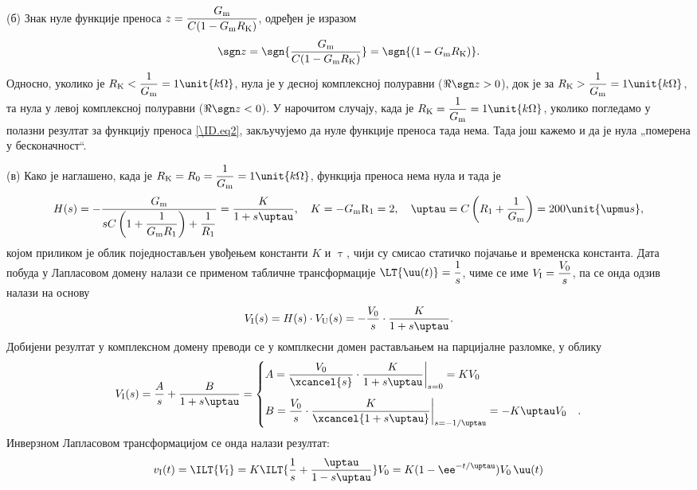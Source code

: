 (б) Знак нуле функције преноса $z = \dfrac{G_{\rm m}}{C(1 - G_{\rm m} R_{\rm K})}$, одређен је изразом
\begin{equation}
    \sgn z = \sgn {\dfrac{G_{\rm m}}{C(1 - G_{\rm m} R_{\rm K})}} = \sgn{(1 - G_{\rm m} R_{\rm K})}.
\end{equation}
Односно, уколико је $R_{\rm K} < \dfrac{1}{G_{\rm m}} = 1\unit{k\Omega}$, нула је у десној комплексној полуравни ($\Re{\sgn z} > 0$), док је 
за $R_{\rm K} > \dfrac{1}{G_{\rm m}} = 1\unit{k\Omega}$, та нула у левој комплексној полуравни ($\Re {\sgn z} < 0$). У нарочитом случају, 
када је $R_{\rm K} = \dfrac{1}{G_{\rm m}} = 1\unit{k\Omega}$, уколико погледамо у полазни резултат за функцију преноса \ref{\ID.eq2}, закључујемо да нуле функције преноса 
тада нема. Тада још кажемо и да је нула „померена у бесконачност“.

(в) Како је наглашено, када је $R_{\rm K} = R_0 = \dfrac{1}{G_{\rm m}} = 1\unit{k\Omega}$, функција преноса нема нула и тада је 
\begin{equation}
    H(s) = - \dfrac{G_{\rm m} }{ sC\left(1 + \dfrac{1}{G_{\rm m} R_1}\right) + \dfrac{1}{R_1} } 
    = \dfrac{K}{1 + s\uptau}, \quad K = -G_{\rm m}{\rm R_1} = 2, \quad \uptau = C\left( R_1 + \dfrac{1}{G_{\rm m}} \right) = 200\unit{\upmu s},
\end{equation}
којом приликом је облик поједностављен увођењем константи $K$ и $\uptau$, чији су смисао статичко појачање и временска константа.  
Дата побуда у Лапласовом домену налази се применом табличне трансформације 
$\LT{\uu(t)} = \dfrac{1}{s}$, чиме се име $V_{\rm I} = \dfrac{V_0}{s}$, па се онда одзив налази на основу 
\begin{eqnarray}
    V_{\rm I}(s) = H(s) \cdot V_{\rm U}(s) = - \dfrac{V_{0}}{s} \cdot \dfrac{K}{1 + s\uptau}.
\end{eqnarray}
Добијени резултат у комплексном домену преводи се у комплкесни домен растављањем на парцијалне разломке, у облику 
\begin{eqnarray} 
    V_{\rm I}(s) = \dfrac{A}{s} + \dfrac{B}{1 + s\uptau} = 
    \begin{cases}
        A = \dfrac{V_{0}}{\xcancel{s}} \cdot  \dfrac{K}{1 + s\uptau}  \bigg|_{s = 0} = 
        K V_0 & \\[5mm]
        B =  
        \dfrac{V_{0}}{s} \cdot  \dfrac{K}{\xcancel{1 + s\uptau}}  \bigg|_{s = -1/\uptau} = -K \uptau V_0
        &.
    \end{cases}
\end{eqnarray}
Инверзном Лапласовом трансформацијом се онда налази резултат: 
\begin{equation}
    v_{\rm I}(t) = \ILT{V_{\rm I}} = K \ILT{ \dfrac{1}{s} + \dfrac{\uptau}{1 - s\uptau} } V_0 = 
    {K}(1 - \ee^{-t/\uptau} ) V_0 \, \uu(t)
\end{equation}

